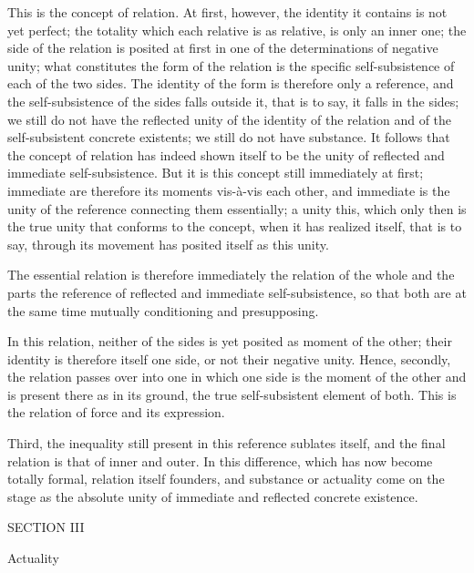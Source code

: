 This is the concept of relation.
At first, however, the identity it contains is not yet perfect;
the totality which each relative is as relative,
is only an inner one;
the side of the relation is posited at first
in one of the determinations of negative unity;
what constitutes the form of the relation is
the specific self-subsistence of each of the two sides.
The identity of the form is therefore only a reference,
and the self-subsistence of the sides falls outside it,
that is to say, it falls in the sides;
we still do not have the reflected unity
of the identity of the relation
and of the self-subsistent concrete existents;
we still do not have substance.
It follows that the concept of relation has
indeed shown itself to be the unity
of reflected and immediate self-subsistence.
But it is this concept still immediately at first;
immediate are therefore its moments vis-à-vis each other,
and immediate is the unity of the reference
connecting them essentially;
a unity this, which only then is the true unity
that conforms to the concept,
when it has realized itself, that is to say,
through its movement has posited itself as this unity.

The essential relation is therefore immediately
the relation of the whole and the parts
the reference of reflected and immediate self-subsistence,
so that both are at the same time
mutually conditioning and presupposing.

In this relation, neither of the sides is
yet posited as moment of the other;
their identity is therefore itself one side,
or not their negative unity.
Hence, secondly, the relation passes over into one
in which one side is the moment of the other
and is present there as in its ground,
the true self-subsistent element of both.
This is the relation of force and its expression.

Third, the inequality still present
in this reference sublates itself,
and the final relation is that of inner and outer.
In this difference, which has now become totally formal,
relation itself founders, and substance or actuality
come on the stage as the absolute unity of
immediate and reflected concrete existence.

SECTION III

Actuality

